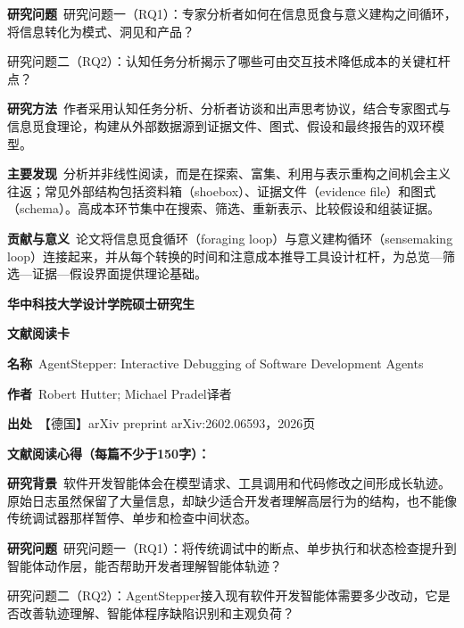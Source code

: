 \noindent\textbf{研究问题}\ 研究问题一（RQ1）：专家分析者如何在信息觅食与意义建构之间循环，将信息转化为模式、洞见和产品？\par
研究问题二（RQ2）：认知任务分析揭示了哪些可由交互技术降低成本的关键杠杆点？\par
\noindent\textbf{研究方法}\ 作者采用认知任务分析、分析者访谈和出声思考协议，结合专家图式与信息觅食理论，构建从外部数据源到证据文件、图式、假设和最终报告的双环模型。\par
\noindent\textbf{主要发现}\ 分析并非线性阅读，而是在探索、富集、利用与表示重构之间机会主义往返；常见外部结构包括资料箱（shoebox）、证据文件（evidence file）和图式（schema）。高成本环节集中在搜索、筛选、重新表示、比较假设和组装证据。\par
\noindent\textbf{贡献与意义}\ 论文将信息觅食循环（foraging loop）与意义建构循环（sensemaking loop）连接起来，并从每个转换的时间和注意成本推导工具设计杠杆，为总览—筛选—证据—假设界面提供理论基础。\par
\clearpage
\begin{center}
{\songti\bfseries\fontsize{18.5pt}{27.75pt}\selectfont 华中科技大学设计学院硕士研究生\par}
{\songti\bfseries\fontsize{18.5pt}{27.75pt}\selectfont 文献阅读卡\par}
\end{center}
\vspace{0.25em}
\noindent\underline{}\par
\vspace{0.35em}
\noindent\textbf{名称}\ AgentStepper: Interactive Debugging of Software Development Agents\par
\noindent\textbf{作者}\ Robert Hutter; Michael Pradel\quad 译者\par
\noindent\textbf{出处}\ 【德国】arXiv preprint arXiv:2602.06593，2026\quad 页\par
\vspace{0.35em}
\noindent\textbf{文献阅读心得（每篇不少于150字）：}\par
\noindent\textbf{研究背景}\ 软件开发智能体会在模型请求、工具调用和代码修改之间形成长轨迹。原始日志虽然保留了大量信息，却缺少适合开发者理解高层行为的结构，也不能像传统调试器那样暂停、单步和检查中间状态。\par
\noindent\textbf{研究问题}\ 研究问题一（RQ1）：将传统调试中的断点、单步执行和状态检查提升到智能体动作层，能否帮助开发者理解智能体轨迹？\par
研究问题二（RQ2）：AgentStepper接入现有软件开发智能体需要多少改动，它是否改善轨迹理解、智能体程序缺陷识别和主观负荷？\par
